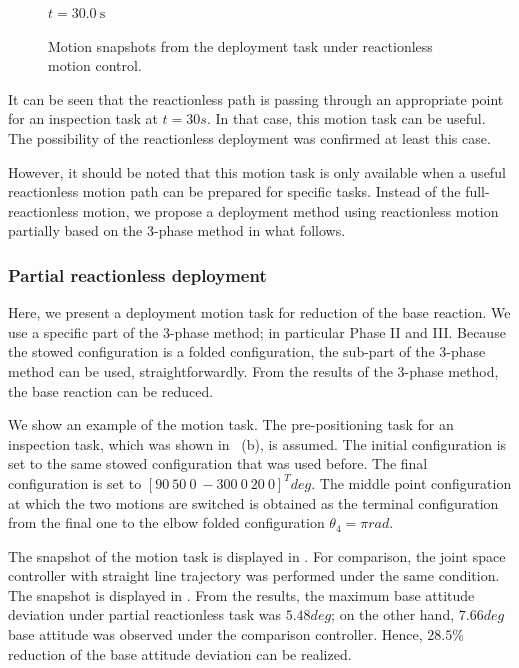 \begin{figure}[t]
\begin{minipage}[h]{0.28\linewidth}
      \centering
      \par\footnotesize{$t = 30.0~\mathrm{s}$}
    \end{minipage}
  \caption{Motion snapshots from the deployment task under reactionless motion control.}
  \label{fig:SNAP_DEPLOY}
\end{figure}
%
It can be seen that the reactionless path is
passing through an appropriate point for an inspection task at $t = 30\unit{s}$.
In that case,
this motion task can be useful.
The possibility of the reactionless deployment was confirmed at least this case.

However, it should be noted that this motion task is only available when
a useful reactionless motion path can be prepared for specific tasks.
Instead of the full-reactionless motion,
we propose a deployment method using reactionless motion partially based on
the 3-phase method in what follows.

\subsubsection{Partial reactionless deployment}
Here, we present a deployment motion task for reduction of the base reaction.
We use a specific part of the 3-phase method;
in particular Phase II and III.
Because the stowed configuration is a folded configuration,
the sub-part of the 3-phase method can be used, straightforwardly.
From the results of the 3-phase method,
the base reaction can be reduced.

We show an example of the motion task.
The pre-positioning task for an inspection task, which was shown in ~(b), is assumed.
The initial configuration is set to the same stowed configuration that was used before.
The final configuration is set to $[90~50~0~-300~0~20~0]^{T}\unit{deg}$.
The middle point configuration at which the two motions are switched is obtained
as the terminal configuration from the final one
to the elbow folded configuration $\theta_{4} = \pi\unit{rad}$.

The snapshot of the motion task is displayed in .
For comparison, the joint space controller with straight line trajectory was performed
under the same condition.
The snapshot is displayed in .
From the results, the maximum base attitude deviation under partial reactionless task was
$5.48\unit{deg}$;
on the other hand,
$7.66\unit{deg}$ base attitude was observed under the comparison controller.
Hence, $28.5\%$ reduction of the base attitude deviation can be realized.

